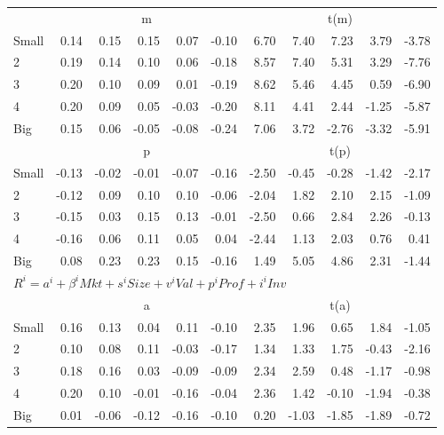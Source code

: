 \begin{table}[!ht]
\begin{tabular}{lrrrrrrrrrr}
  
     & \multicolumn{5}{c}{m} & \multicolumn{5}{c}{t(m)}   \\
     \cmidrule(r){2-6} \cmidrule(r){7-11} 
    Small  & 0.14  & 0.15  & 0.15  & 0.07  & -0.10  & 6.70  & 7.40  & 7.23  & 3.79  & -3.78   \\
    2  & 0.19  & 0.14  & 0.10  & 0.06  & -0.18  & 8.57  & 7.40  & 5.31  & 3.29  & -7.76   \\
    3  & 0.20  & 0.10  & 0.09  & 0.01  & -0.19  & 8.62  & 5.46  & 4.45  & 0.59  & -6.90   \\
    4  & 0.20  & 0.09  & 0.05  & -0.03  & -0.20  & 8.11  & 4.41  & 2.44  & -1.25  & -5.87   \\
    Big  & 0.15  & 0.06  & -0.05  & -0.08  & -0.24  & 7.06  & 3.72  & -2.76  & -3.32  & -5.91   \\
    
  
     & \multicolumn{5}{c}{p} & \multicolumn{5}{c}{t(p)}   \\
     \cmidrule(r){2-6} \cmidrule(r){7-11} 
    Small  & -0.13  & -0.02  & -0.01  & -0.07  & -0.16  & -2.50  & -0.45  & -0.28  & -1.42  & -2.17   \\
    2  & -0.12  & 0.09  & 0.10  & 0.10  & -0.06  & -2.04  & 1.82  & 2.10  & 2.15  & -1.09   \\
    3  & -0.15  & 0.03  & 0.15  & 0.13  & -0.01  & -2.50  & 0.66  & 2.84  & 2.26  & -0.13   \\
    4  & -0.16  & 0.06  & 0.11  & 0.05  & 0.04  & -2.44  & 1.13  & 2.03  & 0.76  & 0.41   \\
    Big  & 0.08  & 0.23  & 0.23  & 0.15  & -0.16  & 1.49  & 5.05  & 4.86  & 2.31  & -1.44   \\
    

  \midrule
  \multicolumn{11}{l}{$R^i=a^i+\beta^iMkt+s^iSize+v^iVal+p^iProf+i^iInv$}  \\
  
     & \multicolumn{5}{c}{a} & \multicolumn{5}{c}{t(a)}   \\
     \cmidrule(r){2-6} \cmidrule(r){7-11} 
    Small  & 0.16  & 0.13  & 0.04  & 0.11  & -0.10  & 2.35  & 1.96  & 0.65  & 1.84  & -1.05   \\
    2  & 0.10  & 0.08  & 0.11  & -0.03  & -0.17  & 1.34  & 1.33  & 1.75  & -0.43  & -2.16   \\
    3  & 0.18  & 0.16  & 0.03  & -0.09  & -0.09  & 2.34  & 2.59  & 0.48  & -1.17  & -0.98   \\
    4  & 0.20  & 0.10  & -0.01  & -0.16  & -0.04  & 2.36  & 1.42  & -0.10  & -1.94  & -0.38   \\
    Big  & 0.01  & -0.06  & -0.12  & -0.16  & -0.10  & 0.20  & -1.03  & -1.85  & -1.89  & -0.72   \\

  \bottomrule
\end{tabular}
\label{tbl:Size_Beta}
\end{table}